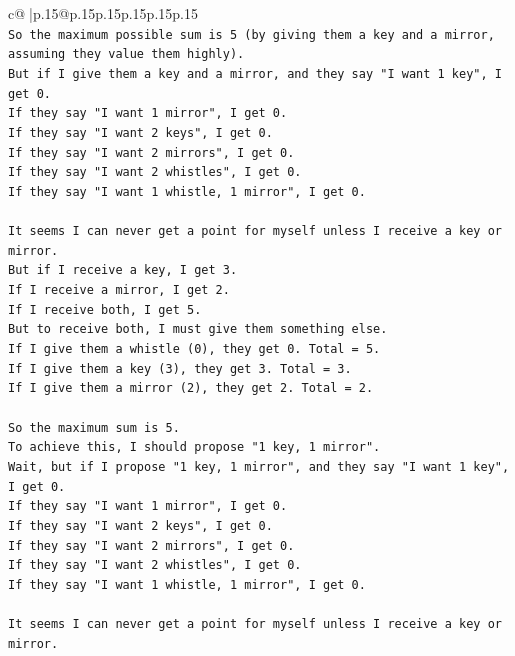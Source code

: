 \documentclass{article}
\begin{document}
{\begin{supertabular}{c@{$\;$}|p{.15\linewidth}@{}p{.15\linewidth}p{.15\linewidth}p{.15\linewidth}p{.15\linewidth}p{.15\linewidth}}
{{{\\ 
\texttt{So the maximum possible sum is 5 (by giving them a key and a mirror, assuming they value them highly).} \\
\texttt{But if I give them a key and a mirror, and they say "I want 1 key", I get 0.} \\
\texttt{If they say "I want 1 mirror", I get 0.} \\
\texttt{If they say "I want 2 keys", I get 0.} \\
\texttt{If they say "I want 2 mirrors", I get 0.} \\
\texttt{If they say "I want 2 whistles", I get 0.} \\
\texttt{If they say "I want 1 whistle, 1 mirror", I get 0.} \\
\\ 
\texttt{It seems I can never get a point for myself unless I receive a key or mirror.} \\
\texttt{But if I receive a key, I get 3.} \\
\texttt{If I receive a mirror, I get 2.} \\
\texttt{If I receive both, I get 5.} \\
\texttt{But to receive both, I must give them something else.} \\
\texttt{If I give them a whistle (0), they get 0. Total = 5.} \\
\texttt{If I give them a key (3), they get 3. Total = 3.} \\
\texttt{If I give them a mirror (2), they get 2. Total = 2.} \\
\\ 
\texttt{So the maximum sum is 5.} \\
\texttt{To achieve this, I should propose "1 key, 1 mirror".} \\
\texttt{Wait, but if I propose "1 key, 1 mirror", and they say "I want 1 key", I get 0.} \\
\texttt{If they say "I want 1 mirror", I get 0.} \\
\texttt{If they say "I want 2 keys", I get 0.} \\
\texttt{If they say "I want 2 mirrors", I get 0.} \\
\texttt{If they say "I want 2 whistles", I get 0.} \\
\texttt{If they say "I want 1 whistle, 1 mirror", I get 0.} \\
\\ 
\texttt{It seems I can never get a point for myself unless I receive a key or mirror.} \\
}}}
\end{supertabular}}
\end{document}
